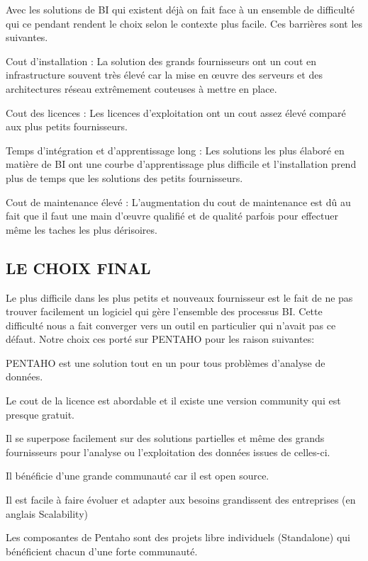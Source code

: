 	Avec les solutions de BI qui existent déjà on fait face à un ensemble de difficulté qui ce pendant rendent le choix selon le contexte plus facile. Ces barrières sont les suivantes.
	\begin{list}{•}{ }
	   \item Cout d’installation : La solution des grands fournisseurs ont un cout en infrastructure souvent très élevé car la mise en œuvre des serveurs et des architectures réseau extrêmement couteuses à  mettre en place.
	   \item Cout des licences : Les licences d’exploitation ont un cout assez élevé comparé aux plus petits fournisseurs.
	   \item Temps d’intégration et d’apprentissage long : Les solutions les plus élaboré en matière de BI ont une courbe d’apprentissage plus difficile et l’installation prend plus de temps que les solutions des petits fournisseurs.
	   \item Cout de maintenance élevé : L’augmentation du cout de maintenance est dû au fait que il faut une main d’œuvre qualifié et de qualité parfois pour effectuer même les taches les plus dérisoires.\\
	\end{list}
	
\subsection{LE CHOIX FINAL}

Le plus difficile dans les plus petits et nouveaux fournisseur est le fait de ne pas trouver facilement un logiciel qui gère l’ensemble des processus BI. Cette difficulté nous a fait converger vers un outil en particulier qui n’avait pas ce défaut. Notre choix ces porté sur PENTAHO pour les raison suivantes:
\begin{list}{•}{ }
   \item PENTAHO est une solution tout en un pour tous problèmes d’analyse de données.
   \item Le cout de la licence est abordable et il existe une version community qui est presque gratuit.
   \item Il se superpose facilement sur des solutions partielles et même des grands fournisseurs pour l’analyse ou l’exploitation des données issues de celles-ci.
   \item Il bénéficie d’une grande communauté car il est open source.
   \item Il est facile à faire évoluer et adapter aux besoins grandissent des entreprises (en anglais Scalability)
   \item Les composantes de Pentaho sont des projets libre individuels (Standalone) qui bénéficient chacun d’une forte communauté.\\
\end{list}


